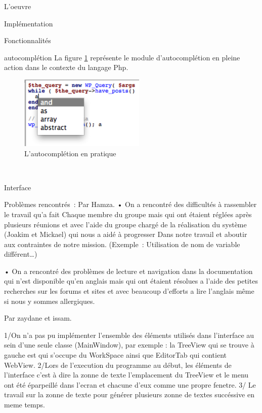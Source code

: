 \documentclass[a4paper, 12pt]{report}
\begin{document}
\begin{part}{L'oeuvre}
\begin{chapter}{Implémentation}
\begin{section}{Fonctionnalités}
\begin{subsection}{\Gls{autocomplétion}}
					La figure \ref{tabouret} représente le module d'\gls{autocomplétion} en pleine action dans le contexte du langage \gls{Php}.

					\begin{figure}[h]
						\begin{center}
							\includegraphics[width=6cm]{images/screenAutocmpl.png}
							\caption{L'autocomplétion en pratique}
							\label{tabouret}
						\end{center}
					\end{figure}~\\
				\end{subsection}
			\end{section}
			\begin{section}{Interface}

			Problèmes rencontrés : 
	Par Hamza.
	•	On a rencontré des difficultés à rassembler le travail qu’a fait 
Chaque membre du groupe mais qui ont étaient réglées après plusieurs réunions et avec  l'aide du groupe chargé de la réalisation du système (Joakim et Mickael) qui nous a aidé à progresser
Dans notre travail et aboutir aux contraintes de notre mission.
(Exemple : Utilisation de nom de variable différent…)

	•	On a rencontré des problèmes de lecture et navigation  dans la documentation   qui n’est disponible qu’en anglais mais qui ont étaient résolues a l’aide   des petites recherches sur les forums et sites et avec beaucoup d’efforts a lire l’anglais même si nous y sommes allergiques. 

Par zaydane et issam.

1/On n'a pas pu implémenter l'ensemble des éléments utilisés dans l'interface au sein d'une seule classe (MainWindow), par exemple : la TreeView qui se trouve à gauche est qui s'occupe du WorkSpace ainsi que EditorTab qui contient WebView.
2/Lors de l'execution du programme au début, les éléments de l'interface c'est à dire la zonne de texte l'emplacement du TreeView et le menu ont été éparpeillé dans l'ecran et chacune
d'eux comme une propre fenetre.
3/ Le travail sur la zonne de texte pour générer plusieurs zonne de textes succéssive en meme
temps.




\end{section}
\end{chapter}
\end{part}
\end{document}
